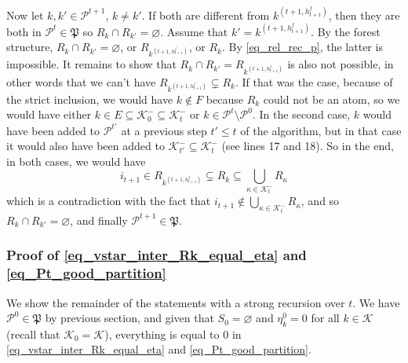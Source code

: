 \documentclass[
  11pt,
  a4paper,
]{article}
\theoremstyle{plain}
\theoremstyle{plain}
\theoremstyle{definition}
\theoremstyle{plain}
\theoremstyle{definition}
\theoremstyle{remark}
\begin{document}
Now let \(k,k'\in\mathcal{P}^{t+1}\), \(k\neq k'\). If both are
different from \(k^{(t+1,h^f_{t+1})}\), then they are both in
\(\mathcal{P}^t\in\mathfrak P\) so \(R_k\cap R_{k'}=\varnothing\).
Assume that \(k'=k^{(t+1,h^f_{t+1})}\). By the forest structure,
\(R_k\cap R_{k'}=\varnothing\), or \(R_{k^{(t+1,h^f_{t+1})}}\), or
\(R_k\). By \eqref{eq_rel_rec_p}, the latter is impossible. It remains
to show that \(R_k\cap R_{k'}=R_{  k^{(t+1,h^f_{t+1})}}\) is also not
possible, in other words that we can't have
\(R_{  k^{(t+1,h^f_{t+1})}} \subsetneq  R_{k}\). If that was the case,
because of the strict inclusion, we would have \(k\not\in F\) because
\(R_{k}\) could not be an atom, so we would have either
\(k\in E\subseteq \mathcal{K}^-_0 \subseteq \mathcal{K}^-_t\) or
\(k\in\mathcal{P}^t\setminus\mathcal{P}^0\). In the second case, \(k\)
would have been added to \(\mathcal{P}^{t'}\) at a previous step
\(t'\leq t\) of the algorithm, but in that case it would also have been
added to \(\mathcal{K}_{t'}^-\subseteq \mathcal{K}_{t}^-\) (see lines 17
and 18). So in the end, in both cases, we would have \begin{equation*}
i_{t+1}\in R_{  k^{(t+1,h^f_{t+1})}}  \subsetneq  R_{k} \subseteq \bigcup_{\kappa\in\mathcal{K}^-_{t}}R_{\kappa}
\end{equation*} which is a contradiction with the fact that
\(i_{t+1}\not\in\bigcup_{\kappa \in \mathcal{K}^-_t} R_{\kappa}\), and
so \(R_k\cap R_{k'}=\varnothing\), and finally
\(\mathcal{P}^{t+1}\in\mathfrak P\).

\subsubsection{\texorpdfstring{Proof of
\eqref{eq_vstar_inter_Rk_equal_eta} and
\eqref{eq_Pt_good_partition}}{Proof of  and }}\label{proof-of-and}

We show the remainder of the statements with a strong recursion over
\(t\). We have \(\mathcal{P}^0\in\mathfrak P\) by previous section, and
given that \(S_0=\varnothing\) and \(\eta^0_k=0\) for all
\(k\in\mathcal{K}\) (recall that \(\mathcal{K}_0=\mathcal{K}\)),
everything is equal to 0 in \eqref{eq_vstar_inter_Rk_equal_eta} and
\eqref{eq_Pt_good_partition}.
\end{document}
